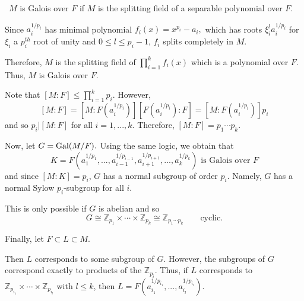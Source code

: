 \documentclass[12pt]{AlgebraQual}
\begin{document}
\begin{solution}$\,$
$M$ is Galois over $F$ if $M$ is the splitting field of a separable polynomial over $F.$

Since $a_i^{1/p_i}$ has minimal polynomial $f_i(x)=x^{p_i}-a_i,$ which has roots $\xi_i^la_i^{1/p_i}$ for $\xi_i$ a $p_i^{th}$ root of unity and $0\le l\le p_i-1$, $f_i$ splits completely in $M$.

Therefore, $M$ is the splitting field of $\prod_{i=1}^kf_i(x)$ which is a polynomial over $F$. Thus, $M$ is Galois over $F.$

Note that $[M:F]\le \prod_{i=1}^kp_i$. However, $$[M:F]=[M:F(a_i^{1/p_i})][F(a_i^{1/p_i}):F]=[M:F(a_i^{1/p_i})]p_i$$ and so $p_i|[M:F]$ for all $i=1,...,k$. Therefore, $[M:F]=p_1\cdots p_k.$

Now, let $G=\text{Gal}(M/F).$ Using the same logic, we obtain that $$K=F(a_1^{1/p_1},...,a_{i-1}^{1/p_{i-1}},a_{i+1}^{1/p_{i+1}},...,a_k^{1/p_k})\text{ is Galois over }F$$ and since $[M:K]=p_i$, $G$ has a normal subgroup of order $p_i$. Namely, $G$ has a normal Sylow $p_i$-subgroup for all $i.$

This is only possible if $G$ is abelian and so $$G\cong\mathbb{Z}_{p_1}\times\cdots\times\mathbb{Z}_{p_k}\cong\mathbb{Z}_{p_1\cdots p_k}\qquad\text{cyclic}.$$

Finally, let $F\subset L\subset M.$

Then $L$ corresponds to some subgroup of $G$. However, the subgroups of $G$ correspond exactly to products of the $\mathbb{Z}_{p_i}$. Thus, if $L$ corresponds to $\mathbb{Z}_{p_{i_1}}\times\cdots\times\mathbb{Z}_{p_{i_l}}$ with $l\le k$, then $L=F(a_{i_1}^{1/p_{i_1}},...,a_{i_l}^{1/p_{i_l}})$.
\end{solution}
\newpage
\end{document}
